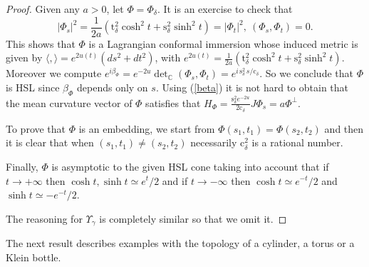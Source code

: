 \documentclass[leqno,11pt]{amsart}
\begin{document}
\begin{proof}
Given any $a>0$, let $\Phi=\Phi_\delta$. It is an exercise to
check that
$$
|\Phi_s|^2=\frac{1}{2a}\left(
\mathrm{t}_\delta^2\cosh^2t+\mathrm{s}_\delta^2
\sinh^2t\right)=|\Phi_t|^2, \ (\Phi_s,\Phi_t)=0.
$$
This shows that $\Phi$ is a Lagrangian conformal immersion whose
induced metric is given by $\langle ,
\rangle=e^{2u(t)}\left(ds^2+dt^2\right)$, with $e^{2u(t)}
=\frac{1}{2a}\left(
\mathrm{t}_\delta^2\cosh^2t+\mathrm{s}_\delta^2 \sinh^2t\right)$.
Moreover we compute
$e^{i\beta_{\Phi}}=e^{-2u}\textstyle\det_{\mathbb{C}}\displaystyle(\Phi_s,\Phi_t)=
e^{i\,\mathrm{s}_\delta^2 \,s / \mathrm{c}_\delta}$. So we
conclude that $\Phi $ is HSL since $\beta_\Phi$ depends only on
$s$. Using (\ref{beta}) it is not hard to obtain that the mean
curvature vector of $\Phi$ satisfies that $
H_\Phi=\frac{\mathrm{s}_\delta^2
e^{-2u}}{2\mathrm{c}_\delta}J\Phi_s=a \Phi^\perp $.

To prove that $\Phi $ is an embedding, we start from
$\Phi(s_1,t_1)=\Phi(s_2,t_2)$ and then it is clear that when
$(s_1,t_1)\neq (s_2,t_2)$  necessarily $\mathrm{c}_\delta^2$ is a
rational number.

Finally, $\Phi$ is asymptotic to the given HSL cone taking into
account that if $t\rightarrow + \infty$ then  $\cosh t, \sinh t
\simeq e^t /2 $ and if $t\rightarrow - \infty$ then $\cosh t
\simeq  e^{-t} /2 $ and $\sinh t \simeq - e^{-t} /2 $.

The reasoning for $\Upsilon_\gamma$ is completely similar so that
we omit it.
\end{proof}

The next result describes examples with the topology of a
cylinder, a torus or a Klein bottle.
\end{document}
